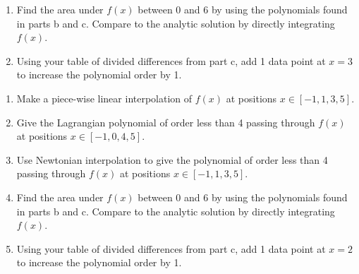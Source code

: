 {\begin{enumerate}[label=\alph*)]
	\item Find the area under $f(x)$ between 0 and 6 by using the polynomials found in parts b and c. Compare to the analytic solution by directly integrating $f(x)$.
	
	\item Using your table of divided differences from part c, add 1 data point at $x=3$ to increase the polynomial order by 1.
\end{enumerate}


\begin{enumerate}[label=\alph*)]
	\item Make a piece-wise linear interpolation of $f(x)$ at positions $x \in [-1,1,3,5]$.
	
	\item Give the Lagrangian polynomial of order less than 4 passing through $f(x)$ at positions $x \in [-1,0,4,5]$.
	
	\item Use Newtonian interpolation to give the polynomial of order less than 4 passing through $f(x)$ at positions $x \in [-1,1,3,5]$.
	
	\item Find the area under $f(x)$ between 0 and 6 by using the polynomials found in parts b and c. Compare to the analytic solution by directly integrating $f(x)$.
	
	\item Using your table of divided differences from part c, add 1 data point at $x=2$ to increase the polynomial order by 1.
\end{enumerate}
}